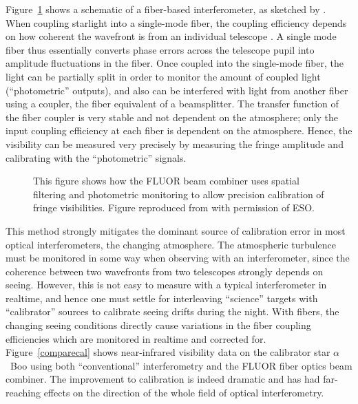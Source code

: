 \documentclass[12pt]{article}
\begin{document}
Figure~\ref{foresto97fig} shows a schematic of a fiber-based
interferometer, as sketched by \citet{foresto1997}.  When coupling
starlight into a single-mode fiber, the coupling efficiency depends on how
coherent the wavefront is from an individual telescope
\citep{shaklan1988}.  A single mode fiber thus essentially converts
phase errors across the telescope pupil into amplitude fluctuations in
the fiber.  Once coupled into the single-mode fiber, the light can be
partially split in order to monitor the amount of coupled light
(``photometric'' outputs), and also can be interfered with light from
another fiber using a coupler, the fiber equivalent of a
beamsplitter.  The transfer function of the fiber coupler is very
stable and not dependent on the atmosphere; only the input coupling
efficiency at each fiber is dependent on the atmosphere.  Hence, the
visibility can be measured very precisely \citep[$<$0.4\% uncertainty on V$^2$
reported by][]{perrin2003} by measuring the fringe amplitude and
calibrating with the ``photometric'' signals.

\begin{figure}
\begin{center}
\centerline{}
\caption{
This figure shows how the FLUOR beam combiner uses 
spatial filtering and photometric monitoring to allow
precision calibration of fringe visibilities.
Figure reproduced from \citet[][Figure1]{foresto1997} with permission of
ESO.
\label{foresto97fig}}
\end{center}
\end{figure}

This method strongly mitigates the dominant source of calibration
error in most optical interferometers, the changing atmosphere.  The
atmospheric turbulence must be monitored in some way when observing
with an interferometer, since the coherence between two wavefronts
from two telescopes strongly depends on seeing. However, this is not
easy to measure with a typical interferometer in realtime, and hence
one must settle for interleaving ``science'' targets with
``calibrator'' sources to calibrate seeing drifts during the night.
With fibers, the changing seeing conditions directly cause variations
in the fiber coupling efficiencies which are monitored in realtime and
corrected for.  Figure~\ref{comparecal} shows near-infrared visibility
data on the calibrator star $\alpha$~Boo using both ``conventional''
interferometry and the FLUOR fiber optics beam combiner.  The
improvement to calibration is indeed dramatic and has had
far-reaching effects on the direction of the whole field of optical
interferometry.
\end{document}
